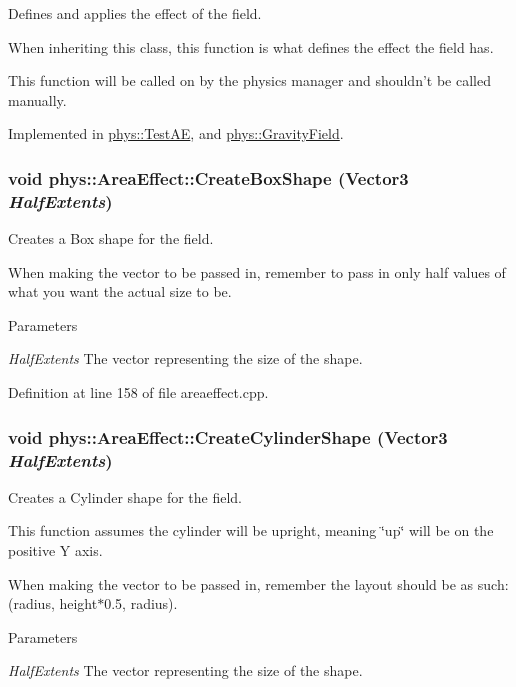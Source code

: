 Defines and applies the effect of the field. 

When inheriting this class, this function is what defines the effect the field has. \par
 This function will be called on by the physics manager and shouldn't be called manually. 

Implemented in \hyperlink{classphys_1_1TestAE_a191c60dbfa277e850ea392d9ab774c42}{phys::TestAE}, and \hyperlink{classphys_1_1GravityField_a0322cb1635bbcb951493d9e17cc9acb1}{phys::GravityField}.

\hypertarget{classphys_1_1AreaEffect_ada171b33d232988b4a728f816217254d}{
\subsubsection[{CreateBoxShape}]{\setlength{\rightskip}{0pt plus 5cm}void phys::AreaEffect::CreateBoxShape ({\bf Vector3} {\em HalfExtents})}}
\label{d4/d55/classphys_1_1AreaEffect_ada171b33d232988b4a728f816217254d}


Creates a Box shape for the field. 

When making the vector to be passed in, remember to pass in only half values of what you want the actual size to be. 
\begin{DoxyParams}{Parameters}
\item[{\em HalfExtents}]The vector representing the size of the shape. \end{DoxyParams}


Definition at line 158 of file areaeffect.cpp.

\hypertarget{classphys_1_1AreaEffect_a7329a52fdd8382d19d39bed1ab2eea61}{
\subsubsection[{CreateCylinderShape}]{\setlength{\rightskip}{0pt plus 5cm}void phys::AreaEffect::CreateCylinderShape ({\bf Vector3} {\em HalfExtents})}}
\label{d4/d55/classphys_1_1AreaEffect_a7329a52fdd8382d19d39bed1ab2eea61}


Creates a Cylinder shape for the field. 

This function assumes the cylinder will be upright, meaning \char`\"{}up\char`\"{} will be on the positive Y axis. \par
 When making the vector to be passed in, remember the layout should be as such: (radius, height$\ast$0.5, radius). 
\begin{DoxyParams}{Parameters}
\item[{\em HalfExtents}]The vector representing the size of the shape. \end{DoxyParams}


